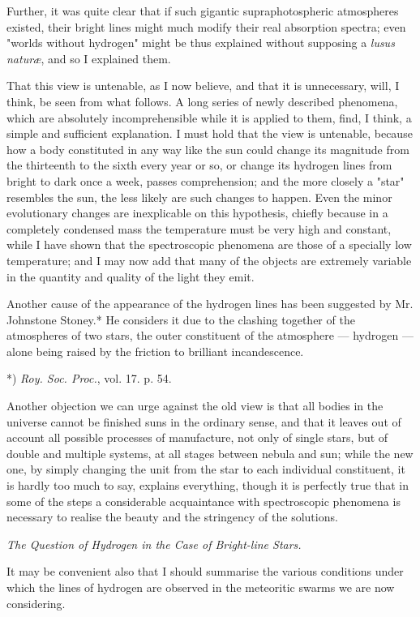 \documentclass[a4paper, 12pt, oneside, polutonikogreek, english]{article}
\begin{document}
Further, it was quite clear that if such gigantic supraphotospheric atmospheres existed, their bright lines might much modify their real absorption spectra; even "worlds without hydrogen" might be thus explained without supposing a \emph{lusus naturæ}, and so I explained them.

That this view is untenable, as I now believe, and that it is unnecessary, will, I think, be seen from what follows. A long series of newly described phenomena, which are absolutely incomprehensible while it is applied to them, find, I think, a simple and sufficient explanation. I must hold that the view is untenable, because how a body constituted in any way like the sun could change its magnitude from the thirteenth to the sixth every year or so, or change its hydrogen lines from bright to dark once a week, passes comprehension; and the more closely a "star" resembles the sun, the less likely are such changes to happen. Even the minor evolutionary changes are inexplicable on this hypothesis, chiefly because in a completely condensed mass the temperature must be very high and constant, while I have shown that the spectroscopic phenomena are those of a specially low temperature; and I may now add that many of the objects are extremely variable in the quantity and quality of the light they emit.

Another cause of the appearance of the hydrogen lines has been suggested by Mr. Johnstone Stoney.* He considers it due to the clashing together of the atmospheres of two stars, the outer constituent of the atmosphere --- hydrogen --- alone being raised by the friction to brilliant incandescence.

*) \emph{Roy. Soc. Proc.}, vol. 17. p. 54.

Another objection we can urge against the old view is that all bodies in the universe cannot be finished suns in the ordinary sense, and that it leaves out of account all possible processes of manufacture, not only of single stars, but of double and multiple systems, at all stages between nebula and sun; while the new one, by simply changing the unit from the star to each individual constituent, it is hardly too much to say, explains everything, though it is perfectly true that in some of the steps a considerable acquaintance with spectroscopic phenomena is necessary to realise the beauty and the stringency of the solutions.

\emph{The Question of Hydrogen in the Case of Bright-line Stars.}

It may be convenient also that I should summarise the various conditions under which the lines of hydrogen are observed in the meteoritic swarms we are now considering.
\end{document}
